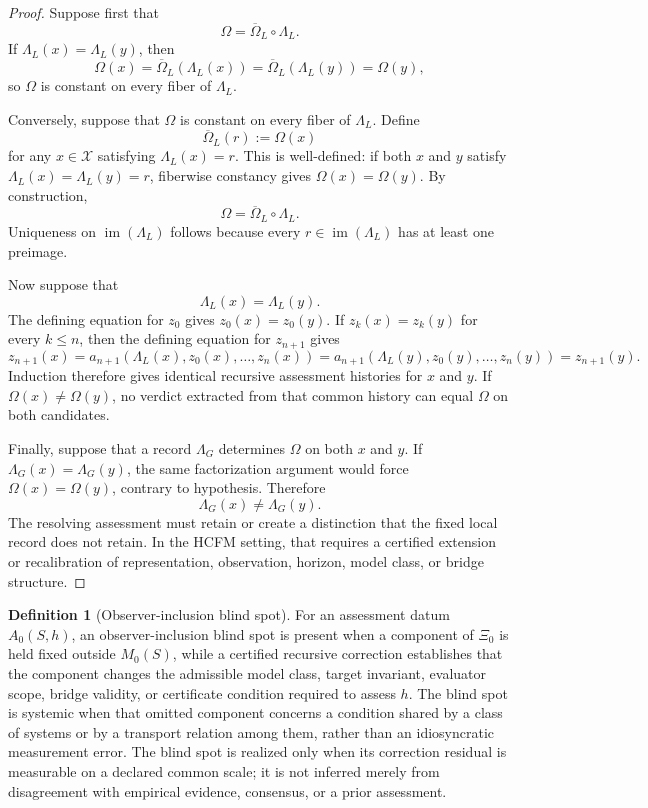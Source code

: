 \documentclass[11pt]{article}
\theoremstyle{definition}
\newtheorem{definition}{Definition}
\begin{document}
\begin{proof}
Suppose first that
\[
\Omega=\overline{\Omega}_L\circ\Lambda_L.
\]
If $\Lambda_L(x)=\Lambda_L(y)$, then
\[
\Omega(x)
=
\overline{\Omega}_L\!\left(\Lambda_L(x)\right)
=
\overline{\Omega}_L\!\left(\Lambda_L(y)\right)
=
\Omega(y),
\]
so $\Omega$ is constant on every fiber of $\Lambda_L$.

Conversely, suppose that $\Omega$ is constant on every fiber of
$\Lambda_L$. Define
\[
\overline{\Omega}_L(r):=\Omega(x)
\]
for any $x\in\mathcal{X}$ satisfying $\Lambda_L(x)=r$. This is well-defined:
if both $x$ and $y$ satisfy $\Lambda_L(x)=\Lambda_L(y)=r$, fiberwise
constancy gives $\Omega(x)=\Omega(y)$. By construction,
\[
\Omega=\overline{\Omega}_L\circ\Lambda_L.
\]
Uniqueness on $\operatorname{im}(\Lambda_L)$ follows because every
$r\in\operatorname{im}(\Lambda_L)$ has at least one preimage.

Now suppose that
\[
\Lambda_L(x)=\Lambda_L(y).
\]
The defining equation for $z_0$ gives $z_0(x)=z_0(y)$. If
$z_k(x)=z_k(y)$ for every $k\leq n$, then the defining equation for
$z_{n+1}$ gives
\[
z_{n+1}(x)
=
a_{n+1}\!\left(
\Lambda_L(x),z_0(x),\ldots,z_n(x)
\right)
=
a_{n+1}\!\left(
\Lambda_L(y),z_0(y),\ldots,z_n(y)
\right)
=
z_{n+1}(y).
\]
Induction therefore gives identical recursive assessment histories for $x$
and $y$. If $\Omega(x)\neq\Omega(y)$, no verdict extracted from that common
history can equal $\Omega$ on both candidates.

Finally, suppose that a record $\Lambda_G$ determines $\Omega$ on both
$x$ and $y$. If $\Lambda_G(x)=\Lambda_G(y)$, the same factorization
argument would force $\Omega(x)=\Omega(y)$, contrary to hypothesis.
Therefore
\[
\Lambda_G(x)\neq\Lambda_G(y).
\]
The resolving assessment must retain or create a distinction that the
fixed local record does not retain. In the HCFM setting, that requires a
certified extension or recalibration of representation, observation,
horizon, model class, or bridge structure.
\end{proof}

\begin{definition}[Observer-inclusion blind spot]
For an assessment datum $A_0(S, h)$, an observer-inclusion blind spot is present when a component of $\Xi_0$ is held fixed outside $M_0(S)$, while a certified recursive correction establishes that the component changes the admissible model class, target invariant, evaluator scope, bridge validity, or certificate condition required to assess $h$. The blind spot is systemic when that omitted component concerns a condition shared by a class of systems or by a transport relation among them, rather than an idiosyncratic measurement error. The blind spot is realized only when its correction residual is measurable on a declared common scale; it is not inferred merely from disagreement with empirical evidence, consensus, or a prior assessment.
\end{definition}
\end{document}
